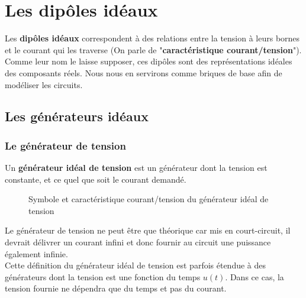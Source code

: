 \chapter{Les dipôles idéaux}

Les \textbf{dipôles idéaux} correspondent à des relations entre la tension à leurs bornes et le courant qui les traverse (On parle de "\textbf{caractéristique courant/tension}"). Comme leur nom le laisse supposer, ces dipôles sont des représentations idéales des composants réels. Nous nous en servirons comme briques de base afin de modéliser les circuits. 

\section{Les générateurs idéaux}

\subsection{Le générateur de tension }

Un \textbf{générateur idéal de tension} est un générateur dont la tension est constante, et ce quel que soit le courant demandé.

\begin{figure}[!h]
\begin{center}

\hspace{1cm}

\end{center}
\caption{ Symbole et caractéristique courant/tension du générateur idéal de tension}
\end{figure}

Le générateur de tension ne peut être que théorique car mis en court-circuit, il devrait délivrer un courant infini et donc fournir au circuit une puissance également infinie.\\

Cette définition du générateur idéal de tension est parfois étendue à des générateurs dont la tension est une fonction du temps $u(t)$. Dans ce cas, la tension fournie ne dépendra que du temps et pas du courant. 

